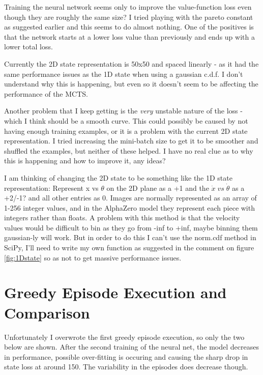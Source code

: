 \documentclass[11.7pt]{article}
\begin{document}
Training the neural network seems only to improve the value-function loss even though they are roughly the same size? I tried playing with the pareto constant as suggested earlier and this seems to do almost nothing. One of the positives is that the network starts at a lower loss value than previously and ends up with a lower total loss.

Currently the 2D state representation is 50x50 and spaced linearly - as it had the same performance issues as the 1D state when using a gaussian c.d.f. I don't understand why this is happening, but even so it doesn't seem to be affecting the performance of the MCTS.

Another problem that I keep getting is the \emph{very} unstable nature of the loss - which I think should be a smooth curve. This could possibly be caused by not having enough training examples, or it is a problem with the current 2D state representation. I tried increasing the mini-batch size to get it to be smoother and shuffled the examples, but neither of these helped. I have no real clue as to why this is happening and how to improve it, any ideas?

I am thinking of changing the 2D state to be something like the 1D state representation: Represent x vs $\theta$ on the 2D plane as a +1 and the $\dot{x} \; vs \; \dot{\theta}$ as a +2/-1? and all other entries as 0. Images are normally represented as an array of 1-256 integer values, and in the AlphaZero model they represent each piece with integers rather than floats. A problem with this method is that the velocity values would be difficult to bin as they go from -inf to +inf, maybe binning them gaussian-ly will work. But in order to do this I can't use the norm.cdf method in SciPy, I'll need to write my own function as suggested in the comment on figure \ref{fig:1Dstate} so as not to get massive performance issues.

\section{Greedy Episode Execution and Comparison}

Unfortunately I overwrote the first greedy episode execution, so only the two below are shown. After the second training of the neural net, the model decreases in performance, possible over-fitting is occuring and causing the sharp drop in state loss at around 150. The variability in the episodes does decrease though.
\end{document}
